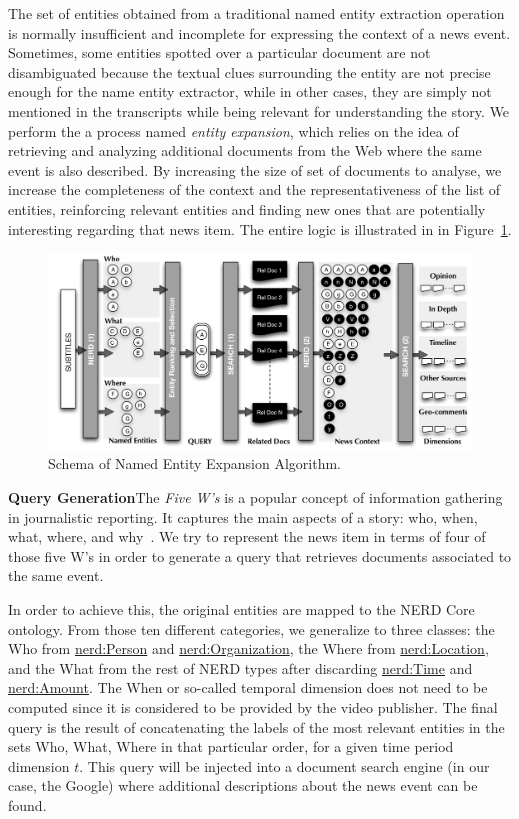 \documentclass{llncs}
\begin{document}
The set of entities obtained from a traditional named entity extraction operation is normally insufficient and incomplete for expressing the context of a news event. Sometimes, some entities spotted over a particular document are not disambiguated because the textual clues surrounding the entity are not precise enough for the name entity extractor, while in other cases, they are simply not mentioned in the transcripts while being relevant for understanding the story. We perform the a process named \emph{entity expansion}, which relies on the idea of retrieving and analyzing additional documents from the Web where the same event is also described. By increasing the size of set of documents to analyse, we increase the completeness of the context and the representativeness of the list of entities, reinforcing relevant entities and finding new ones that are potentially interesting regarding that news item. The entire logic is illustrated in in Figure~\ref{fig:namedEntityExpansion}.

\begin{figure}[t!]
\centering
\includegraphics[width=1\textwidth]{figure/ExpansionDiagram}
\caption{Schema of Named Entity Expansion Algorithm.}
\label{fig:namedEntityExpansion}%
\end{figure}

\textbf{Query Generation}The \emph{Five W's} is a popular concept of information gathering in journalistic reporting. It captures the main aspects of a story: who, when, what, where, and why~\cite{LiJia2007}. We try to represent the news item in terms of four of those five W's in order to generate a query that retrieves documents associated to the same event.

In order to achieve this, the original entities are mapped to the NERD Core ontology. From those ten different categories, we generalize to three classes: the Who from \url{nerd:Person} and \url{nerd:Organization}, the Where from \url{nerd:Location}, and the What from the rest of NERD types after discarding \url{nerd:Time} and \url{nerd:Amount}. The When or so-called temporal dimension does not need to be computed since it is considered to be provided by the video publisher. The final query is the result of concatenating the labels of the most relevant entities in the sets Who, What, Where in that particular order, for a given time period dimension $t$.  
This query will be injected into a document search engine (in our case, the Google) where additional descriptions about the news event can be found.
\end{document}
